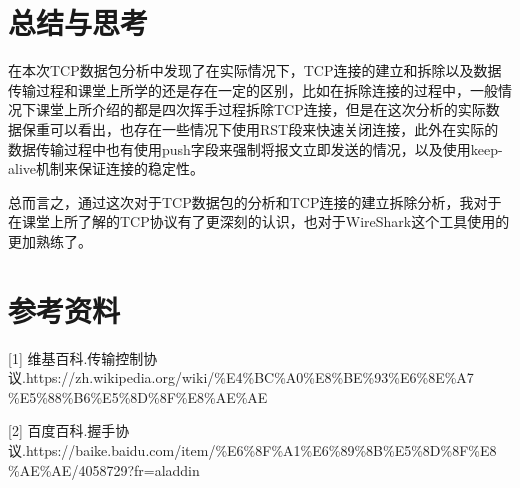 \documentclass[lang=cn,11pt]{elegantpaper}
\begin{document}
\newpage
\section{总结与思考}
在本次TCP数据包分析中发现了在实际情况下，TCP连接的建立和拆除以及数据传输过程和课堂上所学的还是存在一定的区别，比如在拆除连接的过程中，一般情况下课堂上所介绍的都是四次挥手过程拆除TCP连接，但是在这次分析的实际数据保重可以看出，也存在一些情况下使用RST段来快速关闭连接，此外在实际的数据传输过程中也有使用push字段来强制将报文立即发送的情况，以及使用keep-alive机制来保证连接的稳定性。

总而言之，通过这次对于TCP数据包的分析和TCP连接的建立拆除分析，我对于在课堂上所了解的TCP协议有了更深刻的认识，也对于WireShark这个工具使用的更加熟练了。

\section{参考资料}
[1] 维基百科.传输控制协议.https://zh.wikipedia.org/wiki/\%E4\%BC\%A0\%E8\%BE\%93\%E6\%8E\%A7
    \%E5\%88\%B6\%E5\%8D\%8F\%E8\%AE\%AE

[2] 百度百科.握手协议.https://baike.baidu.com/item/\%E6\%8F\%A1\%E6\%89\%8B\%E5\%8D\%8F\%E8
    \%AE\%AE/4058729?fr=aladdin

\nocite{*}

%
%
\end{document}
